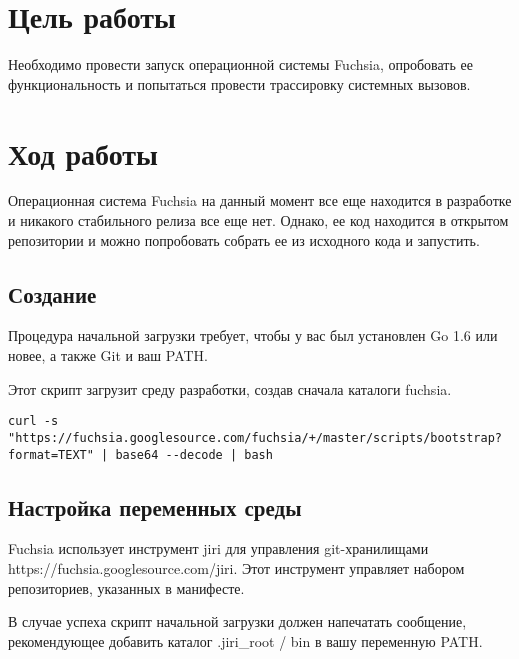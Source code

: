 \documentclass[14pt,a4paper]{article}
\begin{document}





\section{Цель работы}
\par Необходимо провести запуск операционной системы Fuchsia, опробовать ее функциональность и попытаться провести трассировку системных вызовов.


\section{Ход работы}

\par Операционная система Fuchsia на данный момент все еще находится в разработке и никакого стабильного релиза все еще нет. Однако, ее код находится в открытом репозитории и можно попробовать собрать ее из исходного кода и запустить.\\

\subsection{Создание }

\par Процедура начальной загрузки требует, чтобы у вас был установлен Go 1.6 или новее, а также Git и ваш PATH.

\par Этот скрипт загрузит среду разработки, создав сначала каталоги fuchsia. \\

\begin{lstlisting}[language=c caption={}]
curl -s "https://fuchsia.googlesource.com/fuchsia/+/master/scripts/bootstrap?format=TEXT" | base64 --decode | bash
\end{lstlisting}

\subsection{Настройка переменных среды}

\par Fuchsia использует инструмент jiri для управления git-хранилищами https://fuchsia.googlesource.com/jiri. Этот инструмент управляет набором репозиториев, указанных в манифесте.\\

\par В случае успеха скрипт начальной загрузки должен напечатать сообщение, рекомендующее добавить каталог .jiri\_root / bin в вашу переменную PATH.\\
\end{document}
